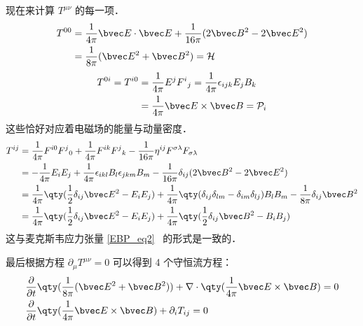 现在来计算 $T^{\mu\nu}$ 的每一项．
\begin{equation}
\begin{aligned}
T^{00}&=\frac{1}{4\pi}\bvec E \cdot \bvec E+\frac{1}{16\pi}(2\bvec B^2-2\bvec E^2)\\
&=\frac{1}{8\pi}(\bvec E^2+\bvec B^2)=\mathcal{H}
\end{aligned}
\end{equation}
\begin{equation}
\begin{aligned}
T^{0i}=T^{i0}&=\frac{1}{4\pi}E^j F^i{}_j=\frac{1}{4\pi}\epsilon_{ijk}E_jB_k\\
&=\frac{1}{4\pi}\bvec E\times \bvec B=\mathcal{P}_i
\end{aligned}
\end{equation}
这些恰好对应着电磁场的能量与动量密度．
\begin{equation}
\begin{aligned}
T^{ij}&=\frac{1}{4\pi}F^{i0}F^j{}_0+\frac{1}{4\pi}F^{ik}F^j{}_k-\frac{1}{16\pi}\eta^{ij}F^{\sigma\lambda}F_{\sigma\lambda}\\
&=-\frac{1}{4\pi}E_iE_j+\frac{1}{4\pi}\epsilon_{ikl}B_l \epsilon_{jkm}B_m-\frac{1}{16\pi}\delta_{ij}(2\bvec B^2-2\bvec E^2)\\
&=\frac{1}{4\pi}\qty(\frac{1}{2}\delta_{ij}\bvec E^2-E_iE_j)+\frac{1}{4\pi}\qty(\delta_{ij}\delta_{lm}-\delta_{im}\delta_{lj})B_lB_m-\frac{1}{8\pi}\delta_{ij}\bvec B^2\\
&=\frac{1}{4\pi}\qty(\frac{1}{2}\delta_{ij}\bvec E^2-E_iE_j)+\frac{1}{4\pi}\qty(\frac{1}{2}\delta_{ij}\bvec B^2 - B_iB_j)
\end{aligned}
\end{equation}
这与麦克斯韦应力张量 \autoref{EBP_eq2}~ 的形式是一致的．

最后根据方程 $\partial_\mu T^{\mu\nu}=0$ 可以得到 4 个守恒流方程：
\begin{equation}
\begin{aligned}
&\frac{\partial }{\partial t}\qty(\frac{1}{8\pi}(\bvec E^2+\bvec B^2))+\nabla \cdot \qty(\frac{1}{4\pi}\bvec E\times \bvec B)=0\\
&\frac{\partial}{\partial t}\qty(\frac{1}{4\pi}\bvec E\times \bvec B)+\partial_i T_{ij}=0
\end{aligned}
\end{equation}